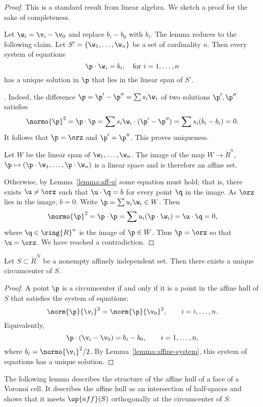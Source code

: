 \begin{proof} This is a standard result from linear algebra.
We sketch a proof for the sake of completeness.  

Let $\w_i = \v_i-\v_0$ and replace $b_i-b_0$ with $b_i$.  
The lemma reduces to the following claim.
Let $S' = \{\w_1,\ldots,\w_n\}$ be a  set
of cardinality $n$.  Then every system of equations
\[  
\p \cdot \w_i = b_i,\quad \text{for }i=1,\ldots,n
\] 
has a unique solution in $\p$ that lies in the linear span of $S'$.

. Indeed, the difference 
$\p = \p'-\p'' = \sum s_i \w_i$ of two solutions
$\p',\p''$ satisfies
\[  
\normo{\p}^2=\p\cdot\p = \sum s_i \w_i \cdot (\p' - \p'') =
\sum s_i (b_i-b_i)= 0.
\] 
It follows that $\p=\orz$ and $\p'=\p''$.  This proves uniqueness.

Let $W$ be the linear span of $\w_1,\ldots,\w_n$.  The image of the
map $W\to\ring{R}^n$, $\p\mapsto (\p\cdot\w_1,\ldots,\p\cdot\w_n)$ is
a linear space and is therefore an affine set.

Otherwise, by Lemma~\ref{lemma:aff-u} some equation must hold; that
is, there exists $\u\ne \orz$ such that $\u\cdot \q =b$ for every
point $\q$ in the image.  As $\orz$ lies in the image, $b=0$.  Write
$\p = \sum u_i \w_i\in W$.  Then
\[  
\normo{\p}^2 = \p\cdot\p = \sum u_i (\p \cdot \w_i) = \u\cdot \q = 0,
\]  
where $\q\in\ring{R}^n$ is the image of $\p\in W$.
Thus $\p=\orz$ so that $\u=\orz$.  We have reached a contradiction.
\end{proof}

\begin{lemma} 
  Let $S\subset \ring{R}^N$ be a nonempty affinely independent set.
  Then there exists a unique circumcenter of $S$.
\end{lemma}

\begin{proof} 
  A point $\p$ is a circumcenter if and only if it is a point in the
  affine hull of $S$ that satisfies the system of equations:
\[  
\norm{\p}{\v_i}^2 = \norm{\p}{\v_0}^2,\qquad i = i,\ldots,n.
\] 
Equivalently,
\[  
\p\cdot (\v_i-\v_0) = b_i-b_0,\qquad i=1,\ldots,n,
\] 
where $b_i = \normo{\v_i}^2/2$.  By
Lemma~\ref{lemma:affine-system}, this system of equations has a unique
solution.
\end{proof}

The following lemma describes the structure of the affine hull of a
face of a Voronoi cell.  It describes the affine hull as an
intersection of half-spaces and shows that it meets $\op{aff}(S)$
orthogonally at the circumcenter of $S$.

